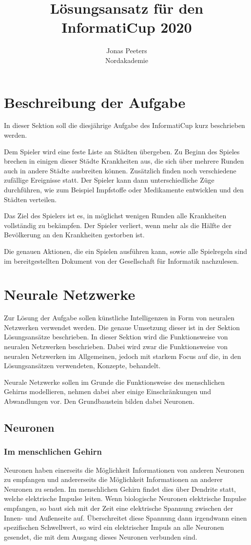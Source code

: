 \documentclass[11pt, twocolumn]{article}
\title{Lösungsansatz für den InformatiCup 2020}
\author{Jonas Peeters\\Nordakademie}
\begin{document}
\maketitle
\tableofcontents

\section{Beschreibung der Aufgabe}
In dieser Sektion soll die diesjährige Aufgabe des InformatiCup kurz beschrieben werden.

Dem Spieler wird eine feste Liste an Städten übergeben. Zu Beginn des Spieles brechen in einigen dieser Städte Krankheiten aus, die sich über mehrere Runden auch in andere Städte ausbreiten können. Zusätzlich finden noch verschiedene zufällige Ereignisse statt. Der Spieler kann dann unterschiedliche Züge durchführen, wie zum Beispiel Impfstoffe oder Medikamente entwicklen und den Städten verteilen.

Das Ziel des Spielers ist es, in möglichst wenigen Runden alle Krankheiten vollständig zu bekämpfen. Der Spieler verliert, wenn mehr als die Hälfte der Bevölkerung an den Krankheiten gestorben ist.

Die genauen Aktionen, die ein Spielen ausführen kann, sowie alle Spielregeln sind im bereitgestellten Dokument von der Gesellschaft für Informatik nachzulesen. 


\section{Neurale Netzwerke}
Zur Lösung der Aufgabe sollen künstliche Intelligenzen in Form von neuralen Netzwerken verwendet werden. Die genaue Umsetzung dieser ist in der Sektion Lösungsansätze beschrieben. In dieser Sektion wird die Funktionsweise von neuralen Netzwerken beschrieben. Dabei wird zwar die Funktionsweise von neuralen Netzwerken im Allgemeinen, jedoch mit starkem Focus auf die, in den Lösungsansätzen verwendeten, Konzepte, behandelt.

Neurale Netzwerke sollen im Grunde die Funktionsweise des menschlichen Gehirns modellieren, nehmen dabei aber einige Einschränkungen und Abwandlungen vor. Den Grundbaustein bilden dabei Neuronen.

\subsection{Neuronen}
\subsubsection{Im menschlichen Gehirn}
Neuronen haben einerseits die Möglichkeit Informationen von anderen Neuronen zu empfangen und andererseits die Möglichkeit Informationen an anderer Neuronen zu senden. Im menschlichen Gehirn findet dies über Dendrite statt, welche elektrische Impulse leiten. Wenn biologische Neuronen elektrische Impulse empfangen, so baut sich mit der Zeit eine elektrische Spannung zwischen der Innen- und Außenseite auf. Überschreitet diese Spannung dann irgendwann einen spezifischen Schwellwert, so wird ein elektrischer Impuls an alle Neuronen gesendet, die mit dem Ausgang dieses Neuronen verbunden sind.
\end{document}
